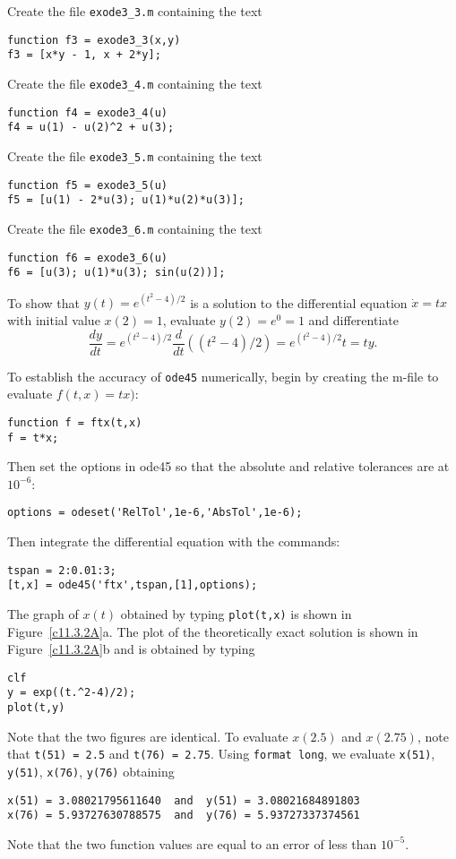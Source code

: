 Create the file {\tt exode3\_3.m} containing the text
\begin{verbatim}
function f3 = exode3_3(x,y)
f3 = [x*y - 1, x + 2*y];
\end{verbatim}

Create the file {\tt exode3\_4.m} containing the text
\begin{verbatim}
function f4 = exode3_4(u)
f4 = u(1) - u(2)^2 + u(3);
\end{verbatim}

Create the file {\tt exode3\_5.m} containing the text
\begin{verbatim}
function f5 = exode3_5(u)
f5 = [u(1) - 2*u(3); u(1)*u(2)*u(3)];
\end{verbatim}

Create the file {\tt exode3\_6.m} containing the text
\begin{verbatim}
function f6 = exode3_6(u)
f6 = [u(3); u(1)*u(3); sin(u(2))];
\end{verbatim}


To show that $y(t)=e^{(t^2-4)/2}$ is a solution to the differential equation
$\dot{x}=tx$ with initial value $x(2)=1$, evaluate $y(2)=e^0=1$ and
differentiate
\[
\frac{dy}{dt} = e^{(t^2-4)/2}\frac{d}{dt}((t^2-4)/2) = 
e^{(t^2-4)/2}t = ty.
\]

To establish the accuracy of {\tt ode45} numerically, begin by creating the 
m-file to evaluate $f(t,x)=tx)$:
\begin{verbatim}
function f = ftx(t,x)
f = t*x;
\end{verbatim}
Then set the options in {\sf ode45} so that the absolute and relative
tolerances are at $10^{-6}$:
\begin{verbatim}
options = odeset('RelTol',1e-6,'AbsTol',1e-6);
\end{verbatim}
Then integrate the differential equation with the commands:
\begin{verbatim}
tspan = 2:0.01:3;
[t,x] = ode45('ftx',tspan,[1],options);
\end{verbatim}
The graph of $x(t)$ obtained by typing {\tt plot(t,x)} is shown in
Figure~\ref{c11.3.2A}a.  The plot of the theoretically exact solution
is shown in Figure~\ref{c11.3.2A}b and is obtained by typing
\begin{verbatim}
clf
y = exp((t.^2-4)/2);
plot(t,y)
\end{verbatim}
Note that the two figures are identical.  To evaluate $x(2.5)$ and $x(2.75)$,
note that {\tt t(51) = 2.5} and {\tt t(76) = 2.75}.  Using {\tt format long}, 
we evaluate {\tt x(51)}, {\tt y(51)}, {\tt x(76)}, {\tt y(76)} obtaining
\newpage
\begin{verbatim}
x(51) = 3.08021795611640  and  y(51) = 3.08021684891803
x(76) = 5.93727630788575  and  y(76) = 5.93727337374561
\end{verbatim}
Note that the two function values are equal to an error of less than 
$10^{-5}$.

